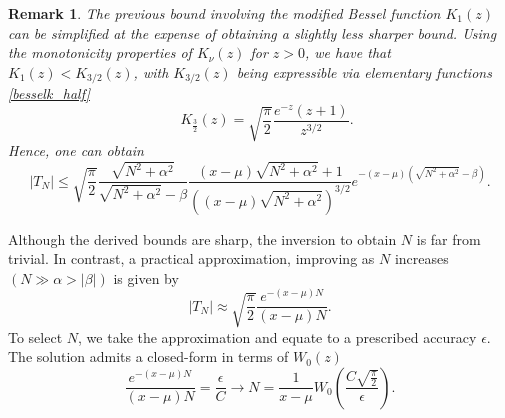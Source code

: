 \documentclass[10pt,a4paper,oneside]{article}
\newtheorem{remark}[theorem]{Remark}
\numberwithin{equation}{section}
\begin{document}
\begin{remark}The previous bound involving the modified Bessel function $K_1(z)$ can be simplified at the expense of obtaining a slightly less sharper bound. Using the monotonicity properties of $K_{\nu}(z)$ for $z > 0$, we have that $K_1(z) < K_{3/2}(z)$, with $K_{3/2}(z)$ being expressible via elementary functions \ref{besselk_half}
\begin{equation*}
\quad K_{\frac{3}{2}}(z) = \sqrt{\frac{\pi}{2}}\frac{e^{-z} (z+1)}{z^{3/2}}.
\end{equation*}
Hence, one can obtain
\begin{equation}
|T_N| \le  \sqrt{\frac{\pi}{2}}\frac{\sqrt{N^2 + \alpha^2}}{\sqrt{N^2 + \alpha^2} - \beta} \frac{(x-\mu)\sqrt{N^2 + \alpha^2} + 1}{\left((x-\mu) \sqrt{N^2 + \alpha^2}\right)^{3/2}} e^{-(x-\mu)\left(\sqrt{N^2 + \alpha^2} - \beta\right)}.
\end{equation}
\end{remark}
Although the derived bounds are sharp, the inversion to obtain $N$ is far from trivial. In contrast, a practical approximation, improving as $N$ increases $(N \gg \alpha > |\beta|)$ is given by
\begin{equation}
|T_N| \approx \sqrt{\frac{\pi}{2}} \frac{e^{-(x-\mu)N}}{(x-\mu) N}.
\end{equation}
To select $N$, we take the approximation and equate to a prescribed accuracy $\epsilon$. The solution admits a closed-form in terms of $W_0(z)$
\begin{equation}
\frac{e^{-(x-\mu)N}}{(x-\mu)N} = \frac{\epsilon}{C} \longrightarrow N = \frac{1}{x-\mu}W_0\left(\frac{C \sqrt{\frac{\pi}{2}}}{\epsilon}\right).
\end{equation}
\end{document}
